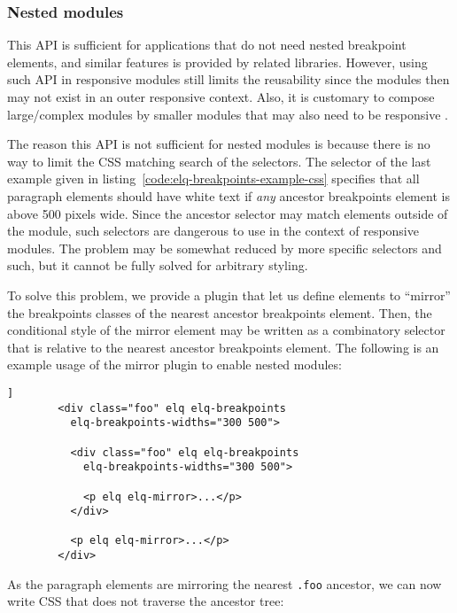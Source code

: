 \documentclass{acm_proc_article-sp}
\newcommand{\code}[1]{\texttt{#1}}
\begin{document}
    \subsubsection{Nested modules}
      This API is sufficient for applications that do not need nested breakpoint elements, and similar features is provided by related libraries.
      However, using such API in responsive modules still limits the reusability since the modules then may not exist in an outer responsive context.
      Also, it is customary to compose large/complex modules by smaller modules that may also need to be responsive \cite{parnas1972criteria}.

      The reason this API is not sufficient for nested modules is because there is no way to limit the CSS matching search of the selectors.
      The selector of the last example given in listing~\ref{code:elq-breakpoints-example-css} specifies that all paragraph elements should have white text if \emph{any} ancestor breakpoints element is above 500 pixels wide.
      Since the ancestor selector may match elements outside of the module, such selectors are dangerous to use in the context of responsive modules.
      The problem may be somewhat reduced by more specific selectors and such, but it cannot be fully solved for arbitrary styling.

      To solve this problem, we provide a plugin that let us define elements to ``mirror'' the breakpoints classes of the nearest ancestor breakpoints element.
      Then, the conditional style of the mirror element may be written as a combinatory selector that is relative to the nearest ancestor breakpoints element.
      The following is an example usage of the mirror plugin to enable nested modules:

      \begin{lstlisting}[gobble=8,caption={},captionpos=b,label={}]]
        <div class="foo" elq elq-breakpoints
          elq-breakpoints-widths="300 500">
          
          <div class="foo" elq elq-breakpoints
            elq-breakpoints-widths="300 500">

            <p elq elq-mirror>...</p>
          </div>

          <p elq elq-mirror>...</p>
        </div>
      \end{lstlisting}

      As the paragraph elements are mirroring the nearest \code{.foo} ancestor, we can now write CSS that does not traverse the ancestor tree:
\end{document}
